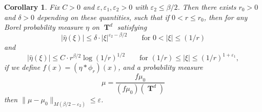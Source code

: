 \documentclass[dvipsnames,letterpaper,12pt]{article}
\numberwithin{equation}{section}
\DeclareMathOperator{\TT}{\mathbf{T}}
\newtheorem{corollary}[theorem]{Corollary}
\numberwithin{theorem}{section}
\begin{document}
\begin{corollary} \label{lemmaIOJDD23124}
    Fix $C > 0$ and $\varepsilon,\varepsilon_1,\varepsilon_2 > 0$ with $\varepsilon_2 \leq \beta/2$. Then there exists $r_0 > 0$ and $\delta > 0$ depending on these quantities, such that if $0 < r \leq r_0$, then for any Borel probability measure $\eta$ on $\TT^d$ satisfying
    \begin{equation} \label{equationADOIJWAOIDJAD}
        \left| \widehat{\eta}(\xi) \right| \leq \delta \cdot |\xi|^{\varepsilon_2-\beta/2}\quad\quad\text{for $0 < |\xi| \leq (1/r)$}
    \end{equation}
    and
    \begin{equation} \label{equationIAOIDJAOICJOIBJOIEVJ2}
        \left| \widehat{\eta}(\xi) \right| \leq C \cdot r^{\beta/2} \log(1/r)^{1/2} \quad\quad\text{for $(1/r) \leq |\xi| \leq (1/r)^{1 + \varepsilon_1}$},
    \end{equation}
    if we define $f(x) = (\eta * \phi_r)(x)$, and a probability measure
    \[ \mu = \frac{f \mu_0}{(f \mu_0)(\TT^d)} \]
    then $\| \mu - \mu_0 \|_{M(\beta/2-\varepsilon_2)} \leq \varepsilon$.
\end{corollary}
\end{document}
